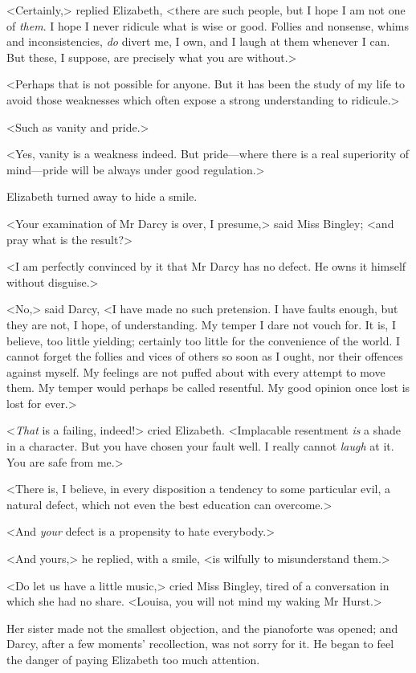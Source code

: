 <Certainly,> replied Elizabeth, <there are such people, but I hope I am not one of \textit{them}. I hope I never ridicule what is wise or good. Follies and nonsense, whims and inconsistencies, \textit{do} divert me, I own, and I laugh at them whenever I can. But these, I suppose, are precisely what you are without.>

<Perhaps that is not possible for anyone. But it has been the study of my life to avoid those weaknesses which often expose a strong understanding to ridicule.>

<Such as vanity and pride.>

<Yes, vanity is a weakness indeed. But pride—where there is a real superiority of mind—pride will be always under good regulation.>

Elizabeth turned away to hide a smile.

<Your examination of Mr Darcy is over, I presume,> said Miss Bingley; <and pray what is the result?>

<I am perfectly convinced by it that Mr Darcy has no defect. He owns it himself without disguise.>

<No,> said Darcy, <I have made no such pretension. I have faults enough, but they are not, I hope, of understanding. My temper I dare not vouch for. It is, I believe, too little yielding; certainly too little for the convenience of the world. I cannot forget the follies and vices of others so soon as I ought, nor their offences against myself. My feelings are not puffed about with every attempt to move them. My temper would perhaps be called resentful. My good opinion once lost is lost for ever.>

<\textit{That} is a failing, indeed!> cried Elizabeth. <Implacable resentment \textit{is} a shade in a character. But you have chosen your fault well. I really cannot \textit{laugh} at it. You are safe from me.>

<There is, I believe, in every disposition a tendency to some particular evil, a natural defect, which not even the best education can overcome.>

<And \textit{your} defect is a propensity to hate everybody.>

<And yours,> he replied, with a smile, <is wilfully to misunderstand them.>

<Do let us have a little music,> cried Miss Bingley, tired of a conversation in which she had no share. <Louisa, you will not mind my waking Mr Hurst.>

Her sister made not the smallest objection, and the pianoforte was opened; and Darcy, after a few moments' recollection, was not sorry for it. He began to feel the danger of paying Elizabeth too much attention.